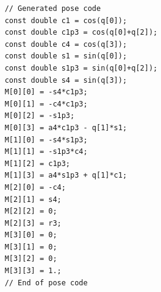 \documentclass{ecnreport}
\begin{document}
  \begin{minipage}{.45\linewidth}
    \cppstyle \raggedright
    \begin{lstlisting}
    // Generated pose code                                                                                                                                                                                                                  
    const double c1 = cos(q[0]);                                                                                                                                                                                                            
    const double c1p3 = cos(q[0]+q[2]);                                                                                                                                                                                                     
    const double c4 = cos(q[3]);                                                                                                                                                                                                            
    const double s1 = sin(q[0]);                                                                                                                                                                                                            
    const double s1p3 = sin(q[0]+q[2]);                                                                                                                                                                                                     
    const double s4 = sin(q[3]);                                                                                                                                                                                                            
    M[0][0] = -s4*c1p3;                                                                                                                                                                                                                     
    M[0][1] = -c4*c1p3;                                                                                                                                                                                                                     
    M[0][2] = -s1p3;                                                                                                                                                                                                                        
    M[0][3] = a4*c1p3 - q[1]*s1;                                                                                                                                                                                                            
    M[1][0] = -s4*s1p3;
    M[1][1] = -s1p3*c4;
    M[1][2] = c1p3;
    M[1][3] = a4*s1p3 + q[1]*c1;
    M[2][0] = -c4;
    M[2][1] = s4;
    M[2][2] = 0;
    M[2][3] = r3;
    M[3][0] = 0;
    M[3][1] = 0;
    M[3][2] = 0;
    M[3][3] = 1.;
    // End of pose code
    \end{lstlisting}
  \end{minipage}
\end{document}
